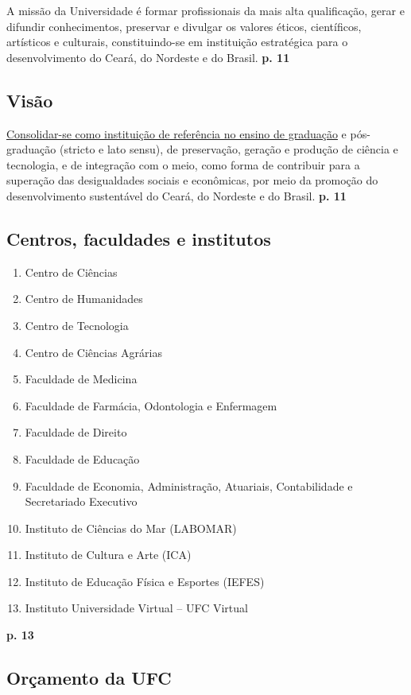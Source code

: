 \documentclass{report}
\begin{document}
A missão da Universidade é formar profissionais da mais alta qualificação, gerar e difundir conhecimentos, preservar e divulgar os valores éticos, científicos, artísticos e culturais, constituindo-se em instituição estratégica para o desenvolvimento do Ceará, do Nordeste e do Brasil.
\textbf{p. 11}

\subsection{Visão}

\underline{Consolidar-se como instituição de referência no ensino de graduação} e pós-graduação (stricto e lato sensu), de preservação, geração e produção de ciência e tecnologia, e de integração com o meio, como forma de contribuir para a superação das desigualdades sociais e econômicas, por meio da promoção do desenvolvimento sustentável do Ceará, do Nordeste e do Brasil.
\textbf{p. 11}

\subsection{Centros, faculdades e institutos}

\begin{enumerate}
\item 
Centro de Ciências
\item 
Centro de Humanidades
\item 
Centro de Tecnologia
\item 
Centro de Ciências Agrárias
\item 
Faculdade de Medicina
\item 
Faculdade de Farmácia, Odontologia e Enfermagem
\item 
Faculdade de Direito
\item 
Faculdade de Educação
\item 
Faculdade de Economia, Administração, Atuariais, Contabilidade e Secretariado Executivo
\item 
Instituto de Ciências do Mar (LABOMAR)
\item 
Instituto de Cultura e Arte (ICA)
\item 
Instituto de Educação Física e Esportes (IEFES)
\item 
Instituto Universidade Virtual – UFC Virtual
\end{enumerate}
\textbf{p. 13}

\subsection{Orçamento da UFC}
\end{document}
